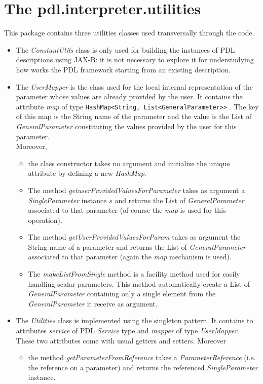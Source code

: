 \documentclass[a4paper,11pt] {ivoa}
\begin{document}
\section{The pdl.interpreter.utilities}\label{utilities}
This package contains three utilities classes used transversally through the code. 
\begin{itemize}
\item The {\it ConstantUtils} class is only used for building the instances of PDL descriptions using JAX-B: it is not necessary to explore it for understudying how works the PDL framework starting from an existing description.
\item The {\it UserMapper} is the class used for the local internal representation of the parameter whose values are already provided by the user. It contains the attribute {\it map} of type {\tt HashMap<String, List<GeneralParameter>>} . The key of this map is the String name of the parameter and the value is the List of {\it GeneralParameter} constituting the values provided by the user for this parameter.\\
Moreover,
\begin{itemize}
\item the class constructor takes no argument and initialize the unique attribute by defining a new {\it HashMap}.
\item The method {\it getuserProvidedValuesForParameter} takes as argument a {\it SingleParameter} instance $s$ and returns the List of {\it GeneralParameter} associated to that parameter (of course the {\it map} is used for this operation).
\item The method {\it getUserProvidedValuesForParam} takes as argument the String name of a parameter and returns the List of {\it GeneralParameter} associated to that parameter (again the {\it  map} mechanism is used).
\item The {\it makeListFromSingle} method is a facility method used for easily handling scalar parameters. This method automatically create a List of {\it GeneralParameter} containing only a single element from the {\it GeneralParameter} it receive as argument.
\end{itemize}
\item The {\it Utilities} class is implemented using the singleton pattern. It contains to attributes {\it service} of PDL {\it Service} type and {\it mapper} of type {\it UserMapper}. These two attributes come with usual getters and setters. Moreover
\begin{itemize}
\item the method {\it getParameterFromReference} takes a {\it ParameterReference} (i.e. the reference on a parameter) and returns the referenced {\it SingleParameter} instance.

\end{itemize}
\end{itemize}
\end{document}
